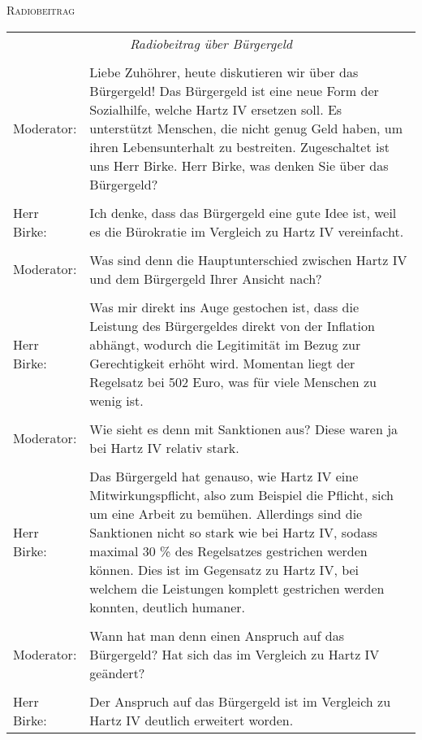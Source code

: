 \documentclass[11pt,a4paper]{article}
\begin{document}
    \textsc{Radiobeitrag}

    \begin{longtable}[c]{p{3cm}p{9cm}}\\
        \multicolumn{2}{c}{\textsl{Radiobeitrag über Bürgergeld}} \\\\
        Moderator: & Liebe Zuhöhrer, heute diskutieren wir über das Bürgergeld!
        Das Bürgergeld ist eine neue Form der Sozialhilfe, welche Hartz IV ersetzen soll.
        Es unterstützt Menschen, die nicht genug Geld haben, um ihren Lebensunterhalt zu bestreiten.
        Zugeschaltet ist uns Herr Birke.
        Herr Birke, was denken Sie über das Bürgergeld? \\\\
        Herr Birke: & Ich denke, dass das Bürgergeld eine gute Idee ist, weil
        es die Bürokratie im Vergleich zu Hartz IV vereinfacht. \\\\
        Moderator: & Was sind denn die Hauptunterschied zwischen Hartz IV und dem
        Bürgergeld Ihrer Ansicht nach? \\\\
        Herr Birke: & Was mir direkt ins Auge gestochen ist, dass die Leistung des Bürgergeldes
        direkt von der Inflation abhängt, wodurch die Legitimität im Bezug zur Gerechtigkeit erhöht wird.
        Momentan liegt der Regelsatz bei 502 Euro, was für viele Menschen zu wenig ist. \\\\
        Moderator: & Wie sieht es denn mit Sanktionen aus?
        Diese waren ja bei Hartz IV relativ stark. \\\\
        Herr Birke: & Das Bürgergeld hat genauso, wie Hartz IV eine Mitwirkungspflicht, also zum Beispiel die Pflicht, sich um eine Arbeit zu bemühen.
        Allerdings sind die Sanktionen nicht so stark wie bei Hartz IV, sodass maximal 30 \% des Regelsatzes gestrichen werden können.
        Dies ist im Gegensatz zu Hartz IV, bei welchem die Leistungen komplett gestrichen werden konnten, deutlich humaner. \\\\
        Moderator: & Wann hat man denn einen Anspruch auf das Bürgergeld?
        Hat sich das im Vergleich zu Hartz IV geändert? \\\\
        Herr Birke: & Der Anspruch auf das Bürgergeld ist im Vergleich zu Hartz IV deutlich erweitert worden.

\end{longtable}
\end{document}
